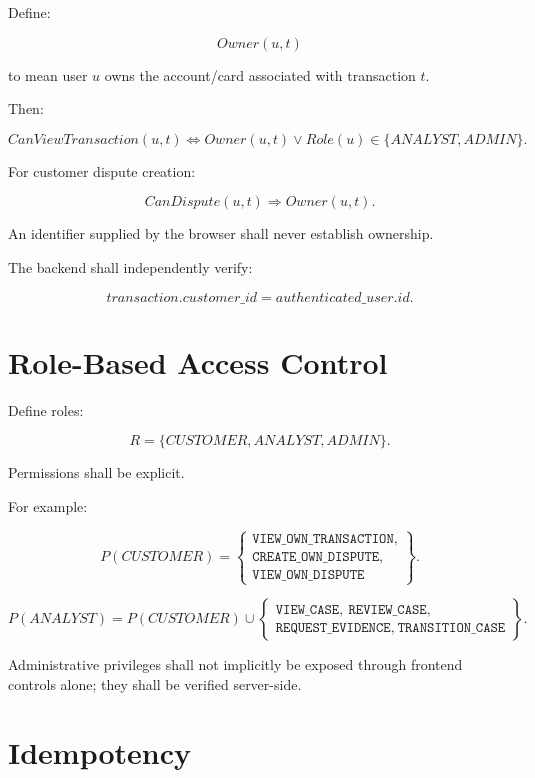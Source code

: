 \documentclass[11pt,a4paper]{article}
\begin{document}
Define:

\[
Owner(u,t)
\]

to mean user \(u\) owns the account/card associated with transaction
\(t\).

Then:

\[
CanViewTransaction(u,t)
\iff
Owner(u,t)
\lor
Role(u)\in\{ANALYST,ADMIN\}.
\]

For customer dispute creation:

\[
CanDispute(u,t)
\Rightarrow
Owner(u,t).
\]

An identifier supplied by the browser shall never establish ownership.

The backend shall independently verify:

\[
transaction.customer\_id
=
authenticated\_user.id.
\]

\section{Role-Based Access Control}

Define roles:

\[
R =
\{
CUSTOMER,
ANALYST,
ADMIN
\}.
\]

Permissions shall be explicit.

For example:

\[
P(CUSTOMER)
=
\left\{
\begin{array}{l}
\texttt{VIEW\_OWN\_TRANSACTION},\\
\texttt{CREATE\_OWN\_DISPUTE},\\
\texttt{VIEW\_OWN\_DISPUTE}
\end{array}
\right\}.
\]

\[
P(ANALYST)
=
P(CUSTOMER)
\cup
\left\{
\begin{array}{l}
\texttt{VIEW\_CASE},\ \texttt{REVIEW\_CASE},\\
\texttt{REQUEST\_EVIDENCE},\ \texttt{TRANSITION\_CASE}
\end{array}
\right\}.
\]

Administrative privileges shall not implicitly be exposed through
frontend controls alone; they shall be verified server-side.

\section{Idempotency}
\end{document}

